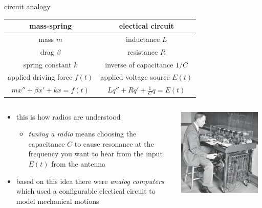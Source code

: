\documentclass[urlcolor=blue,dvipsnames]{beamer}
\begin{document}
\begin{frame}{circuit analogy}

\begin{tabular}{c|c}
mass-spring & electical circuit \\ \hline
mass $m$ & inductance $L$ \\
drag $\beta$ & resistance $R$ \\
spring constant $k$ & inverse of capacitance $1/C$ \\
applied driving force $f(t)$ & applied voltage source $E(t)$ \\
$mx''+\beta x'+k x = f(t)$ & $L q'' + R q' + \frac{1}{C} q=E(t)$
\end{tabular}

\bigskip
\begin{columns}
\begin{column}{0.7\textwidth}
\begin{itemize}
\item this is how radios are understood
    \begin{itemize}
    \item \emph{tuning a radio} means choosing the capacitance  $C$ to cause resonance at the frequency you want to hear from the input $E(t)$ from the antenna
    \end{itemize}
\item based on this idea there were \emph{analog computers} which used a configurable electical circuit to model mechanical motions
\end{itemize}
\end{column}
\begin{column}{0.4\textwidth}
\includegraphics[width=0.95\textwidth]{figs/nordsieck-analog-computer}
\end{column}
\end{columns}
\end{frame}
\end{document}
